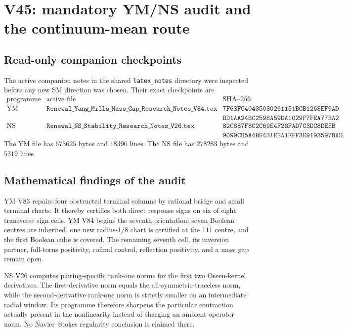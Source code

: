 \documentclass[11pt]{article}
\theoremstyle{remark}
\begin{document}
\section{V45: mandatory YM/NS audit and the continuum-mean route}
\label{sec:v17v45}

\subsection{Read-only companion checkpoints}

The active companion notes in the shared
\texttt{latex\_notes} directory were inspected before any new SM
direction was chosen.  Their exact checkpoints are
\[
\begin{array}{lll}
\text{programme}&\text{active file}&\text{SHA--256}\\
\text{YM}&
\texttt{Renewal\_Yang\_Mills\_Mass\_Gap\_Research\_Notes\_V84.tex}&
\texttt{7F63FC40435030261151BCB1268EF9AD}\\
&&\texttt{BD1AA24BC2598A59DA1029F7FEA77BA2}\\
\text{NS}&
\texttt{Renewal\_NS\_Stability\_Research\_Notes\_V26.tex}&
\texttt{82C887F8C2C69E4F28FAD7C3DC8DE5B}\\
&&\texttt{9099CB5A4BF431EBA1FFF3E91935978AD}.
\end{array}                                        \tag{45.1}
\]
The YM file has \(673625\) bytes and \(18396\) lines.  The NS file has
\(278283\) bytes and \(5319\) lines.

\subsection{Mathematical findings of the audit}

YM V83 repairs four obstructed terminal columns by rational bridge and
small terminal charts.  It thereby certifies both direct response
signs on six of eight transverse sign cells.  YM V84 begins the
seventh orientation: seven Boolean centres are inherited, one new
radius-\(1/8\) chart is certified at the \(111\) centre, and the first
Boolean cube is covered.  The remaining seventh cell, its inversion
partner, full-torus positivity, cofinal control, reflection positivity,
and a mass gap remain open.

NS V26 computes pairing-specific rank-one norms for the first two
Oseen-kernel derivatives.  The first-derivative norm equals the
all-symmetric-traceless norm, while the second-derivative rank-one norm
is strictly smaller on an intermediate radial window.  Its programme
therefore sharpens the particular contraction actually present in the
nonlinearity instead of charging an ambient operator norm.  No
Navier--Stokes regularity conclusion is claimed there.
\end{document}
